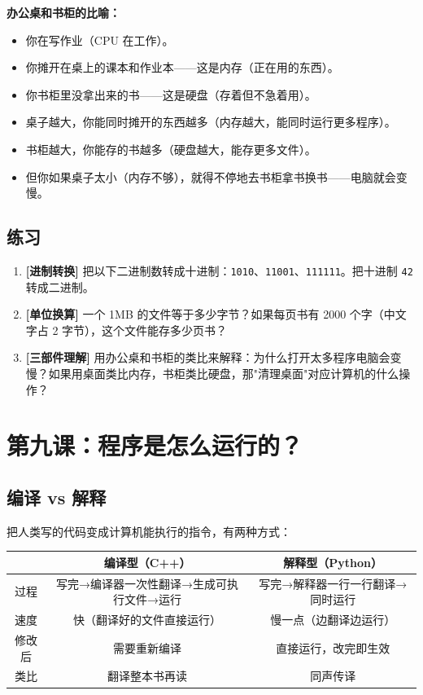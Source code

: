 \documentclass[a4paper,12pt]{ctexart}
\begin{document}
\textbf{办公桌和书柜的比喻：}
\begin{itemize}
  \item 你在写作业（CPU 在工作）。
  \item 你摊开在桌上的课本和作业本——这是内存（正在用的东西）。
  \item 你书柜里没拿出来的书——这是硬盘（存着但不急着用）。
  \item 桌子越大，你能同时摊开的东西越多（内存越大，能同时运行更多程序）。
  \item 书柜越大，你能存的书越多（硬盘越大，能存更多文件）。
  \item 但你如果桌子太小（内存不够），就得不停地去书柜拿书换书——电脑就会变慢。
\end{itemize}

\subsection*{练习}

\begin{enumerate}
  \item \textbf{[进制转换]} 把以下二进制数转成十进制：\texttt{1010}、\texttt{11001}、\texttt{111111}。把十进制 \texttt{42} 转成二进制。
  \item \textbf{[单位换算]} 一个 1MB 的文件等于多少字节？如果每页书有 2000 个字（中文字占 2 字节），这个文件能存多少页书？
  \item \textbf{[三部件理解]} 用办公桌和书柜的类比来解释：为什么打开太多程序电脑会变慢？如果用桌面类比内存，书柜类比硬盘，那"清理桌面"对应计算机的什么操作？
\end{enumerate}

\section*{第九课：程序是怎么运行的？}

\subsection*{编译 vs 解释}

把人类写的代码变成计算机能执行的指令，有两种方式：

\begin{center}
\begin{tabular}{|c|c|c|}
\hline
\textbf{} & \textbf{编译型（C++）} & \textbf{解释型（Python）} \\ \hline
过程 & 写完→编译器一次性翻译→生成可执行文件→运行 & 写完→解释器一行一行翻译→同时运行 \\ \hline
速度 & 快（翻译好的文件直接运行） & 慢一点（边翻译边运行） \\ \hline
修改后 & 需要重新编译 & 直接运行，改完即生效 \\ \hline
类比 & 翻译整本书再读 & 同声传译 \\ \hline
\end{tabular}
\end{center}
\end{document}
